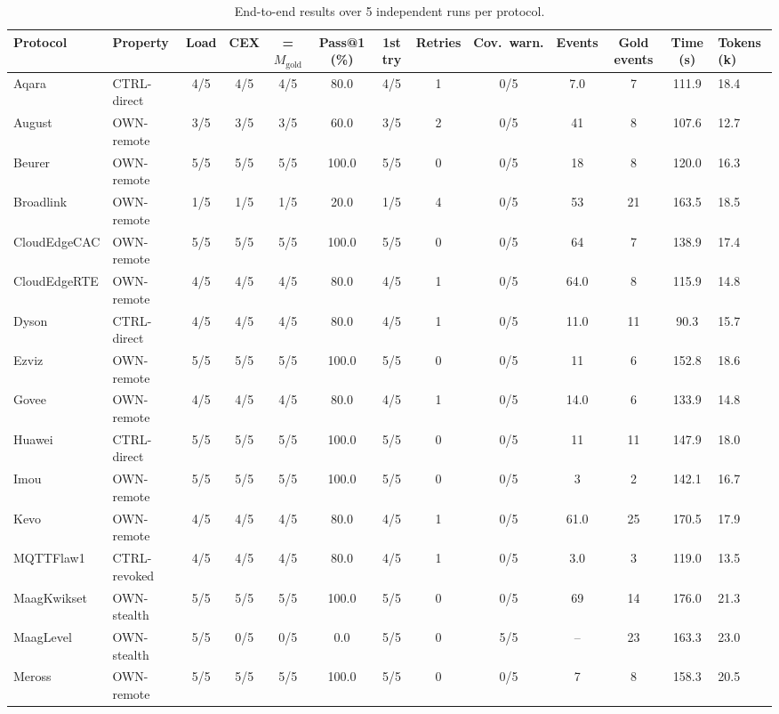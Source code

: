\begin{table}[t]
\centering
\scriptsize
\caption{End-to-end results over 5 independent runs per protocol.}
\label{tab:pilot_eval_matrix}
\begin{tabular*}{\linewidth}{@{\extracolsep{\fill}} ll ccccc ccc cc @{}}
\hline\hline
\textbf{Protocol} & \textbf{Property} & \textbf{Load} & \textbf{CEX} & \textbf{= $M_{\mathrm{gold}}$} & \textbf{Pass@1 (\%)} & \textbf{1st try} & \textbf{Retries} & \textbf{Cov.\ warn.} & \textbf{Events} & \textbf{Gold events} & \textbf{Time (s)} & \textbf{Tokens (k)} \\
\hline
Aqara & CTRL-direct & 4/5 & 4/5 & 4/5 & 80.0 & 4/5 & 1 & 0/5 & 7.0 & 7 & 111.9 & 18.4 \\
August & OWN-remote & 3/5 & 3/5 & 3/5 & 60.0 & 3/5 & 2 & 0/5 & 41 & 8 & 107.6 & 12.7 \\
Beurer & OWN-remote & 5/5 & 5/5 & 5/5 & 100.0 & 5/5 & 0 & 0/5 & 18 & 8 & 120.0 & 16.3 \\
Broadlink & OWN-remote & 1/5 & 1/5 & 1/5 & 20.0 & 1/5 & 4 & 0/5 & 53 & 21 & 163.5 & 18.5 \\
CloudEdgeCAC & OWN-remote & 5/5 & 5/5 & 5/5 & 100.0 & 5/5 & 0 & 0/5 & 64 & 7 & 138.9 & 17.4 \\
CloudEdgeRTE & OWN-remote & 4/5 & 4/5 & 4/5 & 80.0 & 4/5 & 1 & 0/5 & 64.0 & 8 & 115.9 & 14.8 \\
Dyson & CTRL-direct & 4/5 & 4/5 & 4/5 & 80.0 & 4/5 & 1 & 0/5 & 11.0 & 11 & 90.3 & 15.7 \\
Ezviz & OWN-remote & 5/5 & 5/5 & 5/5 & 100.0 & 5/5 & 0 & 0/5 & 11 & 6 & 152.8 & 18.6 \\
Govee & OWN-remote & 4/5 & 4/5 & 4/5 & 80.0 & 4/5 & 1 & 0/5 & 14.0 & 6 & 133.9 & 14.8 \\
Huawei & CTRL-direct & 5/5 & 5/5 & 5/5 & 100.0 & 5/5 & 0 & 0/5 & 11 & 11 & 147.9 & 18.0 \\
Imou & OWN-remote & 5/5 & 5/5 & 5/5 & 100.0 & 5/5 & 0 & 0/5 & 3 & 2 & 142.1 & 16.7 \\
Kevo & OWN-remote & 4/5 & 4/5 & 4/5 & 80.0 & 4/5 & 1 & 0/5 & 61.0 & 25 & 170.5 & 17.9 \\
MQTTFlaw1 & CTRL-revoked & 4/5 & 4/5 & 4/5 & 80.0 & 4/5 & 1 & 0/5 & 3.0 & 3 & 119.0 & 13.5 \\
MaagKwikset & OWN-stealth & 5/5 & 5/5 & 5/5 & 100.0 & 5/5 & 0 & 0/5 & 69 & 14 & 176.0 & 21.3 \\
MaagLevel & OWN-stealth & 5/5 & 0/5 & 0/5 & 0.0 & 5/5 & 0 & 5/5 & -- & 23 & 163.3 & 23.0 \\
Meross & OWN-remote & 5/5 & 5/5 & 5/5 & 100.0 & 5/5 & 0 & 0/5 & 7 & 8 & 158.3 & 20.5 \\

\end{tabular*}
\end{table}
